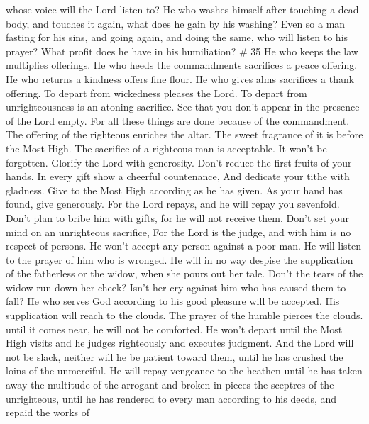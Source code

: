 whose voice will the Lord listen to?  He who washes
himself after touching a dead body, and touches it again, what does he
gain by his washing?  Even so a man fasting for his sins,
and going again, and doing the same, who will listen to his prayer? What
profit does he have in his humiliation? \# 35  He who
keeps the law multiplies offerings. He who heeds the commandments
sacrifices a peace offering.  He who returns a kindness
offers fine flour. He who gives alms sacrifices a thank offering.
 To depart from wickedness pleases the Lord. To depart
from unrighteousness is an atoning sacrifice.  See that
you don't appear in the presence of the Lord empty.  For
all these things are done because of the commandment.  The
offering of the righteous enriches the altar. The sweet fragrance of it
is before the Most High.  The sacrifice of a righteous man
is acceptable. It won't be forgotten.  Glorify the Lord
with generosity. Don't reduce the first fruits of your hands.
 In every gift show a cheerful countenance, And dedicate
your tithe with gladness.  Give to the Most High
according as he has given. As your hand has found, give generously.
 For the Lord repays, and he will repay you sevenfold.
 Don't plan to bribe him with gifts, for he will not
receive them. Don't set your mind on an unrighteous sacrifice, For the
Lord is the judge, and with him is no respect of persons.
 He won't accept any person against a poor man. He will
listen to the prayer of him who is wronged.  He will in
no way despise the supplication of the fatherless or the widow, when she
pours out her tale.  Don't the tears of the widow run
down her cheek? Isn't her cry against him who has caused them to fall?
 He who serves God according to his good pleasure will be
accepted. His supplication will reach to the clouds.  The
prayer of the humble pierces the clouds. until it comes near, he will
not be comforted. He won't depart until the Most High visits and he
judges righteously and executes judgment.  And the Lord
will not be slack, neither will he be patient toward them, until he has
crushed the loins of the unmerciful. He will repay vengeance to the
heathen until he has taken away the multitude of the arrogant and broken
in pieces the sceptres of the unrighteous,  until he has
rendered to every man according to his deeds, and repaid the works of
